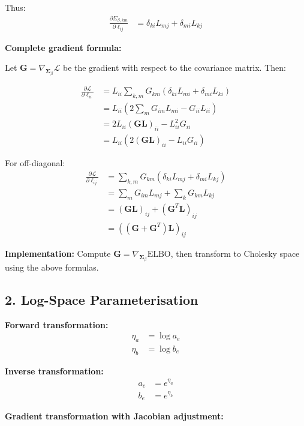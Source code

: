\documentclass[11pt]{article}
\newcommand{\ELBO}{\text{ELBO}}
\begin{document}
Thus:
\begin{align}
\frac{\partial \Sigma_{\beta,km}}{\partial \ell_{ij}} &= \delta_{ki} L_{mj} + \delta_{mi} L_{kj}
\end{align}

\textbf{Complete gradient formula:}

Let $\bm{G} = \nabla_{\bm{\Sigma}_\beta} \mathcal{L}$ be the gradient with respect to the covariance matrix. Then:

\begin{align}
\frac{\partial \mathcal{L}}{\partial \ell_{ii}} &= L_{ii} \sum_{k,m} G_{km} (\delta_{ki} L_{m i} + \delta_{mi} L_{ki})\\
&= L_{ii} \left(2 \sum_{m} G_{im} L_{mi} - G_{ii} L_{ii}\right)\\
&= 2 L_{ii} \left(\bm{G} \bm{L}\right)_{ii} - L_{ii}^2 G_{ii}\\
&= L_{ii} \left(2 (\bm{G} \bm{L})_{ii} - L_{ii} G_{ii}\right)
\end{align}

For off-diagonal:
\begin{align}
\frac{\partial \mathcal{L}}{\partial \ell_{ij}} &= \sum_{k,m} G_{km} (\delta_{ki} L_{mj} + \delta_{mi} L_{kj})\\
&= \sum_m G_{im} L_{mj} + \sum_k G_{km} L_{kj}\\
&= (\bm{G} \bm{L})_{ij} + (\bm{G}^T \bm{L})_{ij}\\
&= ((\bm{G} + \bm{G}^T) \bm{L})_{ij}
\end{align}

\textbf{Implementation:} Compute $\bm{G} = \nabla_{\bm{\Sigma}_\beta} \ELBO$, then transform to Cholesky space using the above formulas.

\subsection*{2. Log-Space Parameterisation}

\textbf{Forward transformation:}
\begin{align}
\eta_a &= \log a_e\\
\eta_b &= \log b_e
\end{align}

\textbf{Inverse transformation:}
\begin{align}
a_e &= e^{\eta_a}\\
b_e &= e^{\eta_b}
\end{align}

\textbf{Gradient transformation with Jacobian adjustment:}
\end{document}
